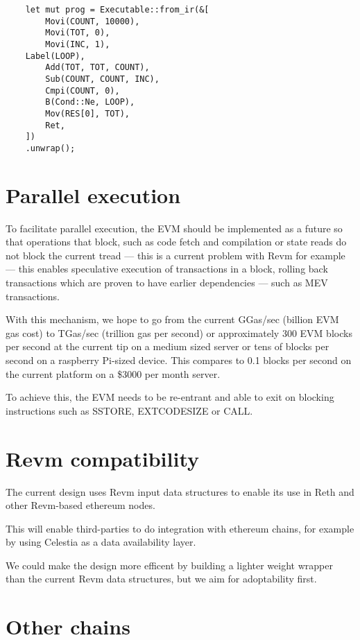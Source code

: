 \documentclass{article}
\begin{document}
\begin{verbatim}
    let mut prog = Executable::from_ir(&[
        Movi(COUNT, 10000),
        Movi(TOT, 0),
        Movi(INC, 1),
    Label(LOOP),
        Add(TOT, TOT, COUNT),
        Sub(COUNT, COUNT, INC),
        Cmpi(COUNT, 0),
        B(Cond::Ne, LOOP),
        Mov(RES[0], TOT),
        Ret,
    ])
    .unwrap();
\end{verbatim}
    

\section{Parallel execution}\label{sec:parallel-execution}
To facilitate parallel execution, the EVM should be implemented as a future
so that operations that block, such as code fetch and compilation or state
reads do not block the current tread --- this is a current problem with Revm
for example --- this enables speculative execution of transactions in a block,
rolling back transactions which are proven to have earlier dependencies --- such
as MEV transactions.

With this mechanism, we hope to go from the current GGas/sec (billion EVM gas cost)
to TGas/sec (trillion gas per second) or approximately 300 EVM blocks per second
at the current tip on a medium sized server or tens of blocks per second on a
raspberry Pi-sized device. This compares to 0.1 blocks per second on the current platform
on a \$3000 per month server.

To achieve this, the EVM needs to be re-entrant and able to exit on blocking
instructions such as SSTORE, EXTCODESIZE or CALL.

\section{Revm compatibility}\label{sec:revm-compatibility}

The current design uses Revm input data structures to enable its use in Reth
and other Revm-based ethereum nodes.

This will enable third-parties to do integration with ethereum chains,
for example by using Celestia as a data availability layer.

We could make the design more efficent by building a lighter weight
wrapper than the current Revm data structures, but we aim for adoptability
first.

\section{Other chains}\label{sec:other-chains}
\end{document}
